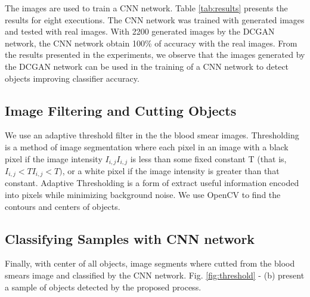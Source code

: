 The images are used to train a CNN network. Table \ref{tab:results} presents the results for eight executions. The CNN network was trained with generated images and tested with real images. With 2200 generated images by the DCGAN network, the CNN network obtain 100\% of accuracy with the real images. From the results presented in the experiments, we observe that the images generated by the DCGAN network can be used in the training of a CNN network to detect objects improving classifier accuracy.



\subsection{Image Filtering and Cutting Objects}

We use an adaptive threshold filter in the the blood smear images.  Thresholding is a method of image segmentation where each pixel in an image with a black pixel if the image intensity ${\displaystyle I_{i,j}} I_{{i,j}}$ is less than some fixed constant T (that is, ${\displaystyle I_{i,j}<T} I_{{i,j}}<T)$, or a white pixel if the image intensity is greater than that constant. Adaptive Thresholding is a form of extract useful information encoded into pixels while minimizing background noise. We use OpenCV to find the contours and centers of objects.

\subsection{Classifying Samples with CNN network}

Finally,  with center of all objects, image segments where cutted from the blood smears image and classified by the CNN network. Fig. \ref{fig:threshold} - (b) present a sample of objects detected by the proposed process.
